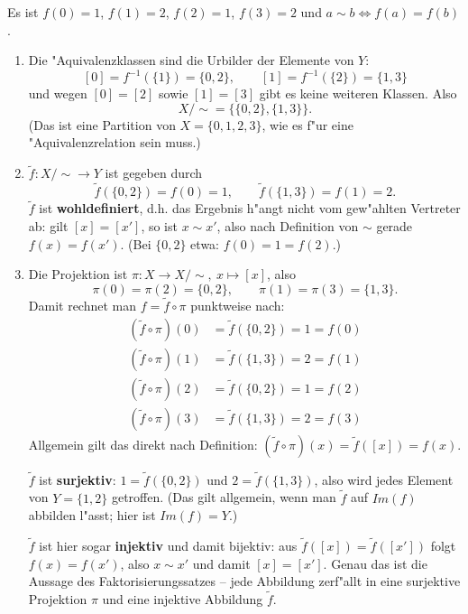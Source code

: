 \begin{loesung}
Es ist $f(0)=1$, $f(1)=2$, $f(2)=1$, $f(3)=2$ und $a\sim b\Leftrightarrow f(a)=f(b)$.
\begin{enumerate}
\item Die "Aquivalenzklassen sind die Urbilder der Elemente von $Y$:
\[[0]=f^{-1}(\{1\})=\{0,2\},\qquad [1]=f^{-1}(\{2\})=\{1,3\}\]
und wegen $[0]=[2]$ sowie $[1]=[3]$ gibt es keine weiteren Klassen. Also
\[X/{\sim}=\{\{0,2\},\{1,3\}\}.\]
(Das ist eine Partition von $X=\{0,1,2,3\}$, wie es f"ur eine "Aquivalenzrelation sein muss.)

\item $\widetilde f:X/{\sim}\to Y$ ist gegeben durch
\[\widetilde f(\{0,2\})=f(0)=1,\qquad \widetilde f(\{1,3\})=f(1)=2.\]
$\widetilde f$ ist \textbf{wohldefiniert}, d.h. das Ergebnis h"angt nicht vom gew"ahlten Vertreter ab: gilt $[x]=[x']$, so ist $x\sim x'$, also nach Definition von $\sim$ gerade $f(x)=f(x')$. (Bei $\{0,2\}$ etwa: $f(0)=1=f(2)$.)

\item Die Projektion ist $\pi:X\to X/{\sim},\ x\mapsto[x]$, also
\[\pi(0)=\pi(2)=\{0,2\},\qquad \pi(1)=\pi(3)=\{1,3\}.\]
Damit rechnet man $f=\widetilde f\circ\pi$ punktweise nach:
\begin{align*}
(\widetilde f\circ\pi)(0)&=\widetilde f(\{0,2\})=1=f(0)\\
(\widetilde f\circ\pi)(1)&=\widetilde f(\{1,3\})=2=f(1)\\
(\widetilde f\circ\pi)(2)&=\widetilde f(\{0,2\})=1=f(2)\\
(\widetilde f\circ\pi)(3)&=\widetilde f(\{1,3\})=2=f(3)
\end{align*}
Allgemein gilt das direkt nach Definition: $(\widetilde f\circ\pi)(x)=\widetilde f([x])=f(x)$.

$\widetilde f$ ist \textbf{surjektiv}: $1=\widetilde f(\{0,2\})$ und $2=\widetilde f(\{1,3\})$, also wird jedes Element von $Y=\{1,2\}$ getroffen. (Das gilt allgemein, wenn man $\widetilde f$ auf $Im(f)$ abbilden l"asst; hier ist $Im(f)=Y$.)

$\widetilde f$ ist hier sogar \textbf{injektiv} und damit bijektiv: aus $\widetilde f([x])=\widetilde f([x'])$ folgt $f(x)=f(x')$, also $x\sim x'$ und damit $[x]=[x']$. Genau das ist die Aussage des Faktorisierungssatzes -- jede Abbildung zerf"allt in eine surjektive Projektion $\pi$ und eine injektive Abbildung $\widetilde f$.
\end{enumerate}
\end{loesung}

